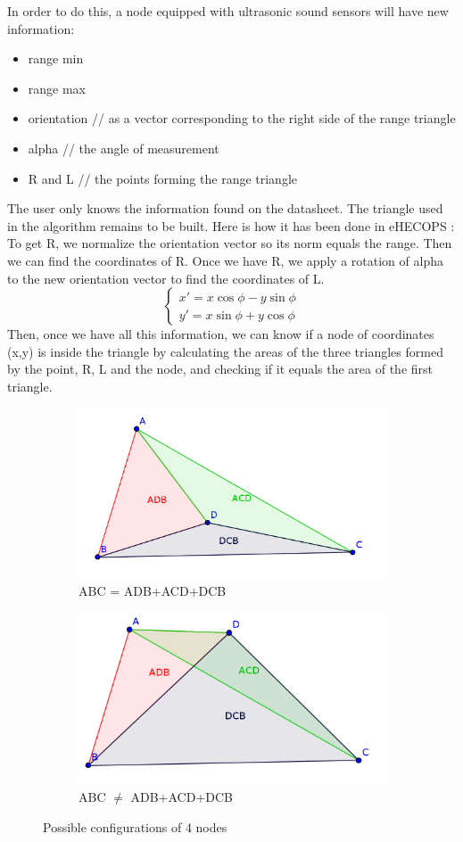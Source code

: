 \documentclass[a4paper,10pt]{article}
\begin{document}
In order to do this, a node equipped with ultrasonic sound sensors will have new information:\\
\begin{itemize}
  \item range min
  \item range max
  \item orientation // as a vector corresponding to the right side of the range triangle
  \item alpha // the angle of measurement
  \item R and L // the points forming the range triangle
\end{itemize}
The user only knows the information found on the datasheet. The triangle used in the algorithm remains to be built. Here is how it has been done in eHECOPS : 
To get R, we normalize the orientation vector so its norm equals the range. Then we can find the coordinates of R. Once we have R, we apply a 
rotation of alpha to the new orientation vector to find the coordinates of L.
$$
\left\{
    \begin{array}{l}
        x' = x\cos\phi - y\sin\phi \\
        y' = x\sin\phi + y\cos\phi
    \end{array}
\right.
$$
Then, once we have all this information, we can know if a node of coordinates (x,y) is inside the triangle by calculating the areas of the 
three triangles formed by the point, R, L and the node, and checking if it equals the area of the first triangle.\\
\begin{figure}[H]
\centering
\begin{subfigure}{.5\textwidth}
  \centering
  \includegraphics[width=.6\linewidth]{point_inside.png}
  \caption{ABC = ADB+ACD+DCB}
  \label{fig:sub1}
\end{subfigure}%
\begin{subfigure}{.5\textwidth}
  \centering
  \includegraphics[width=.6\linewidth]{point_outside.png}
  \caption{ABC $\neq$ ADB+ACD+DCB}
  \label{fig:sub2}
\end{subfigure}
\caption{Possible configurations of 4 nodes}
\label{fig:test}
\end{figure}
\end{document}
